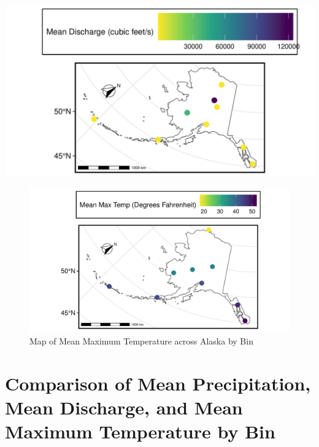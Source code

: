 \documentclass[12pt,]{article}
\begin{document}
\includegraphics{Project_Report_v2_files/figure-latex/unnamed-chunk-6-1.pdf}
\newpage

\begin{figure}
\centering
\includegraphics{Project_Report_v2_files/figure-latex/unnamed-chunk-7-1.pdf}
\caption{Map of Mean Maximum Temperature across Alaska by Bin}
\end{figure}

\hypertarget{comparison-of-mean-precipitation-mean-discharge-and-mean-maximum-temperature-by-bin}{%
\section{Comparison of Mean Precipitation, Mean Discharge, and Mean
Maximum Temperature by
Bin}\label{comparison-of-mean-precipitation-mean-discharge-and-mean-maximum-temperature-by-bin}}
\end{document}
